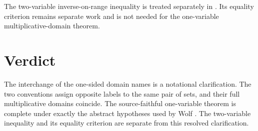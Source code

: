 \documentclass{article}
\begin{document}
The two-variable inverse-on-range inequality is treated separately in
. Its equality
criterion remains separate work and is not needed for the one-variable
multiplicative-domain theorem.

\section{Verdict}

The interchange of the one-sided domain names is a notational clarification.
The two conventions assign opposite labels to the same pair of sets, and their
full multiplicative domains coincide. The source-faithful one-variable theorem
is complete under exactly the abstract hypotheses used by Wolf
\cite[Chapter~5, Equations~(5.2) and (5.11)--(5.14)]{Wolf2012Quantum}. The
two-variable inequality and its equality criterion are separate from this
resolved clarification.



\end{document}
